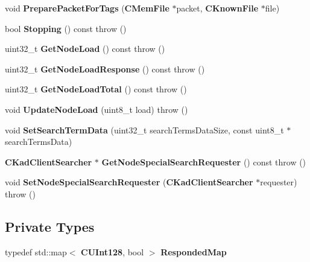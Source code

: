 \begin{DoxyCompactItemize}
\item 
void {\bfseries PreparePacketForTags} ({\bf CMemFile} $\ast$packet, {\bf CKnownFile} $\ast$file)\label{classKademlia_1_1CSearch_a16d61620187e6eb4dfe8b603c62acb1a}

\item 
bool {\bfseries Stopping} () const   throw ()\label{classKademlia_1_1CSearch_a15020857d84a83db19ef1a695ffc02e9}

\item 
uint32\_\-t {\bfseries GetNodeLoad} () const   throw ()\label{classKademlia_1_1CSearch_a60eff9fb92f1b37c49a272cfd7a84317}

\item 
uint32\_\-t {\bfseries GetNodeLoadResponse} () const   throw ()\label{classKademlia_1_1CSearch_a2b68c6df0ab820e9f7fe14b15d8f009b}

\item 
uint32\_\-t {\bfseries GetNodeLoadTotal} () const   throw ()\label{classKademlia_1_1CSearch_a2194bb7d634071a30f187392bd88b57d}

\item 
void {\bfseries UpdateNodeLoad} (uint8\_\-t load)  throw ()\label{classKademlia_1_1CSearch_a423673368aac90345c75c65eaf7b1b6d}

\item 
void {\bfseries SetSearchTermData} (uint32\_\-t searchTermsDataSize, const uint8\_\-t $\ast$searchTermsData)\label{classKademlia_1_1CSearch_a63f63f1e403da999e55973143ded53c5}

\item 
{\bf CKadClientSearcher} $\ast$ {\bfseries GetNodeSpecialSearchRequester} () const   throw ()\label{classKademlia_1_1CSearch_ac3402441d4a8b3f0d5c707ca31a72955}

\item 
void {\bfseries SetNodeSpecialSearchRequester} ({\bf CKadClientSearcher} $\ast$requester)  throw ()\label{classKademlia_1_1CSearch_a41206d30fa895d61e8f7e189f16b1a3b}

\end{DoxyCompactItemize}
\subsection*{Private Types}
\begin{DoxyCompactItemize}
\item 
typedef std::map$<$ {\bf CUInt128}, bool $>$ {\bfseries RespondedMap}\label{classKademlia_1_1CSearch_af99fd332b85065e8e1fd0e224d5af34b}

\end{DoxyCompactItemize}
